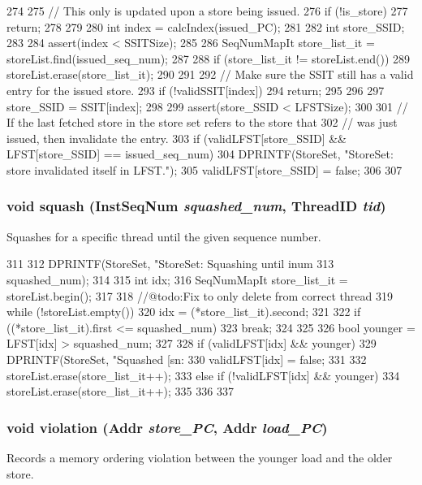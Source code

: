 \begin{DoxyCode}
274 {
275     // This only is updated upon a store being issued.
276     if (!is_store) {
277         return;
278     }
279 
280     int index = calcIndex(issued_PC);
281 
282     int store_SSID;
283 
284     assert(index < SSITSize);
285 
286     SeqNumMapIt store_list_it = storeList.find(issued_seq_num);
287 
288     if (store_list_it != storeList.end()) {
289         storeList.erase(store_list_it);
290     }
291 
292     // Make sure the SSIT still has a valid entry for the issued store.
293     if (!validSSIT[index]) {
294         return;
295     }
296 
297     store_SSID = SSIT[index];
298 
299     assert(store_SSID < LFSTSize);
300 
301     // If the last fetched store in the store set refers to the store that
302     // was just issued, then invalidate the entry.
303     if (validLFST[store_SSID] && LFST[store_SSID] == issued_seq_num) {
304         DPRINTF(StoreSet, "StoreSet: store invalidated itself in LFST.\n");
305         validLFST[store_SSID] = false;
306     }
307 }
\end{DoxyCode}
\hypertarget{classStoreSet_a7ff20e53cb9b14b1794a656def08f910}{
\subsubsection[{squash}]{\setlength{\rightskip}{0pt plus 5cm}void squash ({\bf InstSeqNum} {\em squashed\_\-num}, \/  {\bf ThreadID} {\em tid})}}
\label{classStoreSet_a7ff20e53cb9b14b1794a656def08f910}
Squashes for a specific thread until the given sequence number. 


\begin{DoxyCode}
311 {
312     DPRINTF(StoreSet, "StoreSet: Squashing until inum %
313             squashed_num);
314 
315     int idx;
316     SeqNumMapIt store_list_it = storeList.begin();
317 
318     //@todo:Fix to only delete from correct thread
319     while (!storeList.empty()) {
320         idx = (*store_list_it).second;
321 
322         if ((*store_list_it).first <= squashed_num) {
323             break;
324         }
325 
326         bool younger = LFST[idx] > squashed_num;
327 
328         if (validLFST[idx] && younger) {
329             DPRINTF(StoreSet, "Squashed [sn:%
330             validLFST[idx] = false;
331 
332             storeList.erase(store_list_it++);
333         } else if (!validLFST[idx] && younger) {
334             storeList.erase(store_list_it++);
335         }
336     }
337 }
\end{DoxyCode}
\hypertarget{classStoreSet_a28e9d2d8a7a8df645736800101f56517}{
\subsubsection[{violation}]{\setlength{\rightskip}{0pt plus 5cm}void violation ({\bf Addr} {\em store\_\-PC}, \/  {\bf Addr} {\em load\_\-PC})}}
\label{classStoreSet_a28e9d2d8a7a8df645736800101f56517}
Records a memory ordering violation between the younger load and the older store. 


